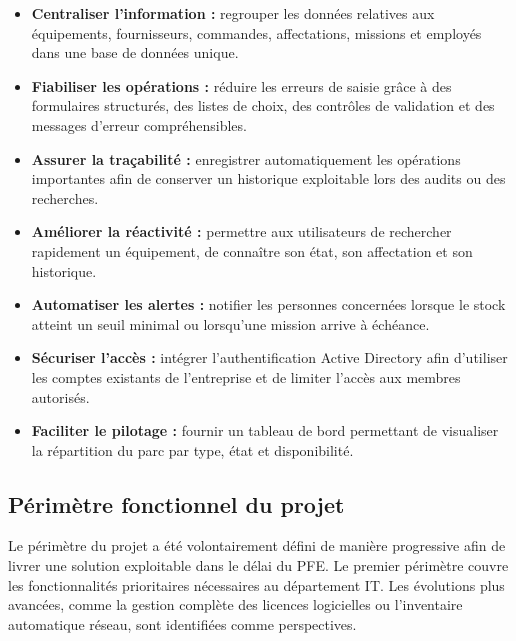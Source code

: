 \begin{itemize}[label=\textbullet,font=\normalsize]
    \item \textbf{Centraliser l'information :} regrouper les données relatives aux équipements, fournisseurs, commandes, affectations, missions et employés dans une base de données unique.
    \item \textbf{Fiabiliser les opérations :} réduire les erreurs de saisie grâce à des formulaires structurés, des listes de choix, des contrôles de validation et des messages d'erreur compréhensibles.
    \item \textbf{Assurer la traçabilité :} enregistrer automatiquement les opérations importantes afin de conserver un historique exploitable lors des audits ou des recherches.
    \item \textbf{Améliorer la réactivité :} permettre aux utilisateurs de rechercher rapidement un équipement, de connaître son état, son affectation et son historique.
    \item \textbf{Automatiser les alertes :} notifier les personnes concernées lorsque le stock atteint un seuil minimal ou lorsqu'une mission arrive à échéance.
    \item \textbf{Sécuriser l'accès :} intégrer l'authentification Active Directory afin d'utiliser les comptes existants de l'entreprise et de limiter l'accès aux membres autorisés.
    \item \textbf{Faciliter le pilotage :} fournir un tableau de bord permettant de visualiser la répartition du parc par type, état et disponibilité.
\end{itemize}

\subsection{Périmètre fonctionnel du projet}

Le périmètre du projet a été volontairement défini de manière progressive afin de livrer une solution exploitable dans le délai du PFE. Le premier périmètre couvre les fonctionnalités prioritaires nécessaires au département IT. Les évolutions plus avancées, comme la gestion complète des licences logicielles ou l'inventaire automatique réseau, sont identifiées comme perspectives.

